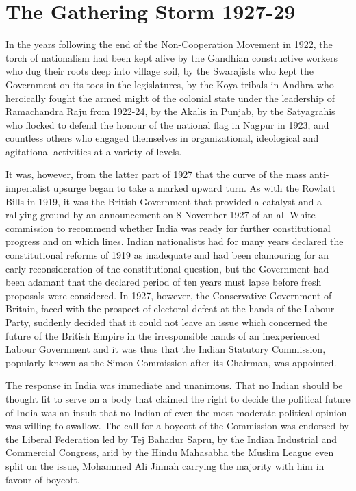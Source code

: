 
\chapter{The Gathering Storm 1927-29}



In the years following the end of the Non-Cooperation Movement in 1922, the torch of nationalism had been kept alive by the Gandhian constructive workers who dug their roots deep into village soil, by the Swarajists who kept the Government on its toes in the legislatures, by the Koya tribals in Andhra who heroically fought the armed might of the colonial state under the leadership of Ramachandra Raju from 1922-24, by the Akalis in Punjab, by the Satyagrahis who flocked to defend the honour of the national flag in Nagpur in 1923, and countless others who engaged themselves in organizational, ideological and agitational activities at a variety of levels. 

It was, however, from the latter part of 1927 that the curve of the mass anti-imperialist upsurge began to take a marked upward turn. As with the Rowlatt Bills in 1919, it was the British Government that provided a catalyst and a rallying ground by an announcement on 8 November 1927 of an all-White commission to recommend whether India was ready for further constitutional progress and on which lines. Indian nationalists had for many years declared the constitutional reforms of 1919 as inadequate and had been clamouring for an early reconsideration of the constitutional question, but the Government had been adamant that the declared period of ten years must lapse before fresh proposals were considered. In 1927, however, the Conservative Government of Britain, faced with the prospect of electoral defeat at the hands of the Labour Party, suddenly decided that it could not leave an issue which concerned the future of the British Empire in the irresponsible hands of an inexperienced Labour Government and it was thus that the Indian Statutory Commission, popularly known as the Simon Commission after its Chairman, was appointed. 

The response in India was immediate and unanimous. That no Indian should be thought fit to serve on a body that claimed the right to decide the political future of India was an insult that no Indian of even the most moderate political opinion was willing to swallow. The call for a boycott of the Commission was endorsed by the Liberal Federation led by Tej Bahadur Sapru, by the Indian Industrial and Commercial Congress, arid by the Hindu Mahasabha the Muslim League even split on the issue, Mohammed Ali Jinnah carrying the majority with him in favour of boycott. 

